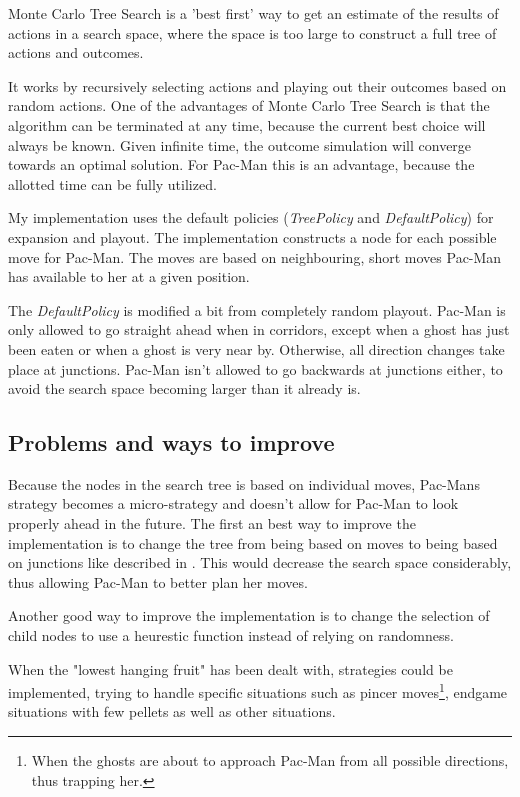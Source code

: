 Monte Carlo Tree Search is a 'best first' way to get an estimate of the results of actions in a search space, where the space is too large to construct a full tree of actions and outcomes.

It works by recursively selecting actions and playing out their outcomes based on random actions.
One of the advantages of Monte Carlo Tree Search is that the algorithm can be terminated at any time, because the current best choice will always be known. Given infinite time, the outcome simulation will converge towards an optimal solution. For Pac-Man this is an advantage, because the allotted time can be fully utilized.

My implementation uses the default policies (\emph{TreePolicy} and \emph{DefaultPolicy}) for expansion and playout. The implementation constructs a node for each possible move for Pac-Man. The moves are based on neighbouring, short moves Pac-Man has available to her at a given position.

The \emph{DefaultPolicy} is modified a bit from completely random playout. Pac-Man is only allowed to go straight ahead when in corridors, except when a ghost has just been eaten or when a ghost is very near by. Otherwise, all direction changes take place at junctions. Pac-Man isn't allowed to go backwards at junctions either, to avoid the search space becoming larger than it already is.

\subsection*{Problems and ways to improve}

Because the nodes in the search tree is based on individual moves, Pac-Mans strategy becomes a micro-strategy and doesn't allow for Pac-Man to look properly ahead in the future. The first an best way to improve the implementation is to change the tree from being based on moves to being based on junctions like described in \cite{enhancements}. This would decrease the search space considerably, thus allowing Pac-Man to better plan her moves.

Another good way to improve the implementation is to change the selection of
child nodes to use a heurestic function instead of relying on randomness.

When the "lowest hanging fruit" has been dealt with, strategies could be implemented, trying to handle specific situations such as pincer moves\footnote{When the ghosts are about to approach Pac-Man from all possible directions, thus trapping her.}, endgame situations with few pellets as well as other situations.